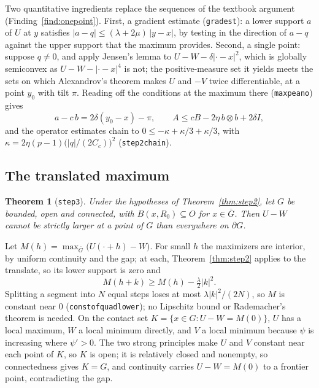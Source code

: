 \documentclass[11pt,reqno]{amsart}
\newcommand{\LEANREF}[1]{\texttt{\small\def\_{\textunderscore\allowbreak}#1}}
\theoremstyle{plain}
\newtheorem{theorem}{Theorem}[section]
\theoremstyle{definition}
\begin{document}
Two quantitative ingredients replace the sequences of the textbook argument
(Finding~\ref{find:onepoint}). First, a gradient estimate
(\LEANREF{grad\_est}): a lower support $a$ of $U$ at $y$ satisfies
$|a - q| \le (\lambda + 2\mu)\,|y - x|$, by testing in the direction of $a - q$
against the upper support that the maximum provides. Second, a single point:
suppose $q \ne 0$, and apply Jensen's lemma to
$U - W - \delta|\cdot - x|^2$, which is globally semiconvex as
$U - W - |\cdot - x|^4$ is not; the positive-measure set it yields meets the
sets on which Alexandrov's theorem makes $U$ and $-V$ twice differentiable, at a
point $y_0$ with tilt $\pi$. Reading off the conditions at the maximum there
(\LEANREF{max\_peano}) gives
\[
  a - c\,b = 2\delta(y_0 - x) - \pi, \qquad
  A \le cB - 2\eta\, b \otimes b + 2\delta I,
\]
and the operator estimates chain to
$0 \le -\kappa + \kappa/3 + \kappa/3$, with
$\kappa = 2\eta(p - 1)\bigl(|q|/(2C_c)\bigr)^2$ (\LEANREF{step2\_chain}).

\subsection{The translated maximum}\label{ssec:step3}

\begin{theorem}[\LEANREF{step3}]\label{thm:step3}
Under the hypotheses of Theorem~\ref{thm:step2}, let $G$ be bounded, open and
connected, with $B(x, R_0) \subseteq O$ for $x \in \overline G$. Then $U - W$
cannot be strictly larger at a point of $G$ than everywhere on $\partial G$.
\end{theorem}

Let $M(h) = \max_{\overline G}\bigl(U(\cdot + h) - W\bigr)$. For small $h$ the
maximizers are interior, by uniform continuity and the gap; at each,
Theorem~\ref{thm:step2} applies to the translate, so its lower support is zero
and
\[
  M(h + k) \ge M(h) - \tfrac\lambda2 |k|^2 .
\]
Splitting a segment into $N$ equal steps loses at most $\lambda|k|^2/(2N)$, so
$M$ is constant near $0$ (\LEANREF{const\_of\_quad\_lower}); no Lipschitz bound
or Rademacher's theorem is needed. On the contact set
$K = \{x \in G : U - W = M(0)\}$, $U$ has a local maximum, $W$ a local minimum
directly, and $V$ a local minimum because $\psi$ is increasing where $\psi' > 0$.
The two strong principles make $U$ and $V$ constant near each point of $K$, so
$K$ is open; it is relatively closed and nonempty, so connectedness gives
$K = G$, and continuity carries $U - W = M(0)$ to a frontier point, contradicting
the gap.
\end{document}
